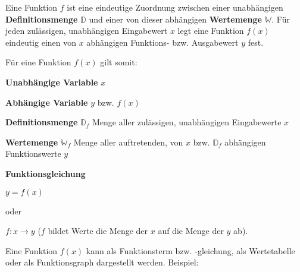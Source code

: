 



\thispagestyle{plain}



Eine Funktion $f$ ist eine eindeutige Zuordnung zwischen einer unabh\"{a}ngigen \textbf{Definitionsmenge} $\mathbb{D}$ und einer von dieser abh\"{a}ngigen \textbf{Wertemenge} $\mathbb{W}$. F\"{u}r jeden zul\"{a}ssigen, unabh\"{a}ngigen Eingabewert $x$ legt eine Funktion $f(x)$ eindeutig einen von $x$ abh\"{a}ngigen Funktions- bzw. Ausgabewert $y$ fest.

F\"{u}r eine Funktion $f(x)$ gilt somit:

\textbf{Unabh\"{a}ngige Variable}  $x$

\textbf{Abh\"{a}ngige Variable}  $y$ bzw. $f(x)$

\textbf{Definitionsmenge} $\mathbb{D}_{f}$  Menge aller zul\"{a}ssigen, unabh\"{a}ngigen Eingabewerte $x$

\textbf{Wertemenge} $\mathbb{W}_{f}$  Menge aller auftretenden, von $x$ bzw. $\mathbb{D}_{f}$ abh\"{a}ngigen Funktionswerte $y$

\textbf{Funktionsgleichung} 

$y = f(x)$

oder

$f: x \rightarrow y$ ($f$ bildet Werte die Menge der $x$ auf die Menge der $y$ ab).


Eine Funktion $f(x)$ kann als Funktionsterm bzw. -gleichung, als Wertetabelle oder als Funktionsgraph dargestellt werden. Beispiel:

